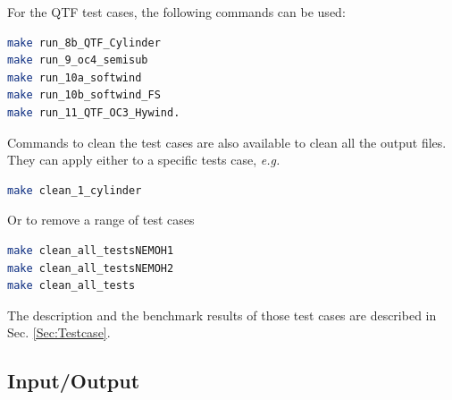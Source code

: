 \documentclass[12pt,a4paper,titlepage]{article}
\begin{document}
For the QTF test cases, the following commands can be used:
\begin{lstlisting}[language=bash,keywordstyle=\color{blue},basicstyle=\ttfamily\footnotesize,backgroundcolor=\color{lightgray}]
make run_8b_QTF_Cylinder
make run_9_oc4_semisub
make run_10a_softwind
make run_10b_softwind_FS
make run_11_QTF_OC3_Hywind.
\end{lstlisting}

Commands to clean the test cases are also available to clean all the output files. They can apply either to a specific tests case, \emph{e.g.} 
\begin{lstlisting}[language=bash,keywordstyle=\color{blue},basicstyle=\ttfamily\footnotesize,backgroundcolor=\color{lightgray}]
make clean_1_cylinder
\end{lstlisting}

Or to remove a range of test cases
\begin{lstlisting}[language=bash,keywordstyle=\color{blue},basicstyle=\ttfamily\footnotesize,backgroundcolor=\color{lightgray}]
make clean_all_testsNEMOH1
make clean_all_testsNEMOH2
make clean_all_tests
\end{lstlisting}

The description and the benchmark results of those test cases are described in Sec. \ref{Sec:Testcase}.

\subsection{Input/Output}
\end{document}
